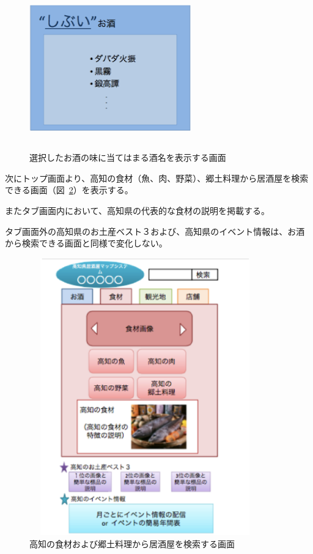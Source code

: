 \documentclass[a4j,titlepage]{jarticle}
\begin{document}
\begin {figure}[!htbp]
    \begin{center}
    \includegraphics [height=7cm, width=7cm]{7.eps}
    \caption {選択したお酒の味に当てはまる酒名を表示する画面}
    \label {fig:7}
    \end{center}
\end {figure}



次にトップ画面より、高知の食材（魚、肉、野菜）、郷土料理から居酒屋を検索できる画面（図~\ref{fig:8}）を表示する。



またタブ画面内において、高知県の代表的な食材の説明を掲載する。



タブ画面外の高知県のお土産ベスト３および、高知県のイベント情報は、お酒から検索できる画面と同様で変化しない。
\clearpage
\begin {figure}[!htbp]
    \begin{center}
    \includegraphics [height=12cm, width=10cm]{8.eps}
    \caption {高知の食材および郷土料理から居酒屋を検索する画面}
    \label {fig:8}
    \end{center}
\end {figure}
\end{document}
